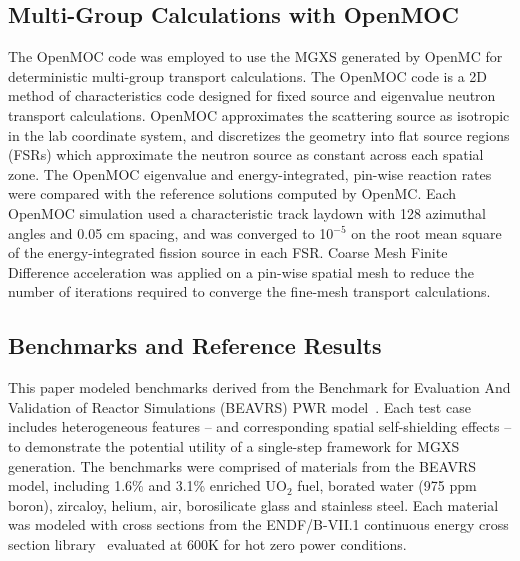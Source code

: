 \subsection{Multi-Group Calculations with OpenMOC}
\label{subsec:openmoc}

The OpenMOC code \cite{boyd2014openmoc} was employed to use the MGXS generated by OpenMC for deterministic multi-group transport calculations. The OpenMOC code is a 2D method of characteristics code designed for fixed source and eigenvalue neutron transport calculations. OpenMOC approximates the scattering source as isotropic in the lab coordinate system, and discretizes the geometry into flat source regions (FSRs) which approximate the neutron source as constant across each spatial zone. The OpenMOC eigenvalue and energy-integrated, pin-wise reaction rates were compared with the reference solutions computed by OpenMC. Each OpenMOC simulation used a characteristic track laydown with 128 azimuthal angles and 0.05 cm spacing, and was converged to 10$^{-5}$ on the root mean square of the energy-integrated fission source in each FSR. Coarse Mesh Finite Difference acceleration was applied on a pin-wise spatial mesh to reduce the number of iterations required to converge the fine-mesh transport calculations.


\subsection{Benchmarks and Reference Results}
\label{subsec:benchmarks}

This paper modeled benchmarks derived from the Benchmark for Evaluation And Validation of Reactor Simulations (BEAVRS) PWR model~\cite{horelik2013beavrs}. Each test case includes heterogeneous features -- and corresponding spatial self-shielding effects -- to demonstrate the potential utility of a single-step framework for MGXS generation. The benchmarks were comprised of materials from the BEAVRS model, including 1.6\% and 3.1\% enriched UO$_2$ fuel, borated water (975 ppm boron), zircaloy, helium, air, borosilicate glass and stainless steel. Each material was modeled with cross sections from the ENDF/B-VII.1 continuous energy cross section library~\cite{mcnpx2003manual} evaluated at 600K for hot zero power conditions. 



